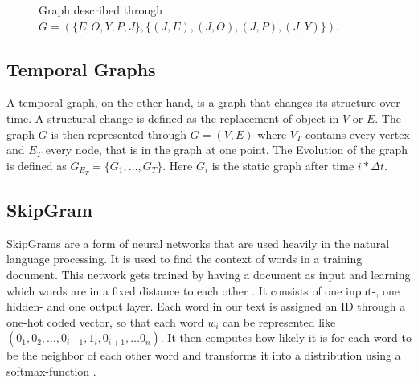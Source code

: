 \documentclass[sigconf]{acmart}
\begin{document}
 \begin{figure}[h]
  \begin{center}
\end{center}
\caption{Graph described through \\ \( G = (\{E,O,Y,P,J\}, \{(J,E),(J,O), (J,P), (J,Y)\}) \).}
\end{figure}

\subsection{Temporal Graphs}
A temporal graph, on the other hand, is a graph that changes its structure over time. A structural change is defined as the replacement of object in \(V\) or \(E\).
The graph \(G\) is then represented through \(G = (V,E)\) where \(V_T\) contains every vertex and \(E_T\) every node, that is in the graph at one point.
The Evolution of the graph is defined as \(G_{E_T} = \{G_1, \ldots, G_T\}\). Here \(G_i\) is the static graph after time \(i*\Delta t\).
\cite{DBLP:journals/corr/abs-1905-05304}

\subsection{SkipGram}
SkipGrams are a form of neural networks that are used heavily in the natural language processing. It is used to find the context of words in a training document.
This network gets trained by having a document as input and learning which words are in a fixed distance to each other \cite{Rong.11.11.2014}.
It consists of one input-, one hidden- and one output layer. 
Each word in our text is assigned an ID through a one-hot coded vector, so that each word \(w_i\) can be represented like \((0_1, 0_2, \ldots, 0_{i-1}, 1_i, 0_{i+1}, \ldots 0_n)\).
It then computes how likely it is for each word to be the neighbor of each other word and transforms it into a distribution using a softmax-function \cite{gao2018properties}.
\end{document}
